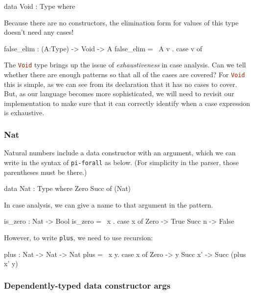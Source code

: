 \documentclass{article}
\newcommand\cd[1]{\lstinline[language=Haskell]{#1}}
\newcommand\pif{\texttt{pi-forall}\xspace}
\theoremstyle{definition}
\begin{document}
\begin{piforall}
data Void : Type where {}
\end{piforall}

Because there are no constructors, the elimination form for values of
this type doesn't need any cases!

\begin{piforall}
false_elim : (A:Type) -> Void -> A
false_elim = \ A v . case v of {}
\end{piforall}

The \cd{Void} type brings up the issue of \emph{exhaustiveness} in case
analysis. Can we tell whether there are enough patterns so that all of the
cases are covered? For \cd{Void} this is simple, as we can see from its declaration
that it has no cases to cover. But, as our language becomes more sophisticated, we will need
to revisit our implementation to make sure that it can correctly identify when a case
expression is exhaustive.

\subsubsection{Nat}\label{nat}

Natural numbers include a data constructor with an argument, which we can
write in the syntax of \pif as below. (For simplicity in the parser, those
parentheses must be there.)

\begin{piforall}
data Nat : Type where
   Zero
   Succ of (Nat)
\end{piforall}

In case analysis, we can give a name to that argument in the pattern.

\begin{piforall}
is_zero : Nat -> Bool
is_zero = \ x . case x of
   Zero -> True
   Succ n -> False
\end{piforall}

However, to write \cd{plus}, we need to use recursion:

\begin{piforall}
plus : Nat -> Nat -> Nat
plus = \ x y. case x of
   Zero -> y
   Succ x' -> Succ (plus x' y)
\end{piforall}

\subsubsection{Dependently-typed data constructor args}
\end{document}
